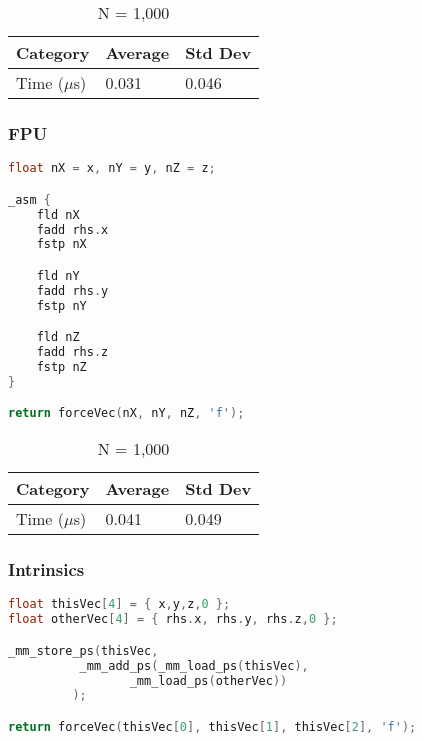 \documentclass{article}
\begin{document}
\vspace{3mm}

\begin{table}[ht!]
\centering
\begin{tabular}{l|l|l}
Category        &   Average &   Std Dev \\
\hline
Time ($\mu$s)    &   0.031   &   0.046   \\
\end{tabular}
\caption{N = 1,000}
\end{table}

\vspace{5mm}

\subsubsection{FPU}

\begin{lstlisting}[language=C++]
float nX = x, nY = y, nZ = z;

_asm {
	fld nX
	fadd rhs.x
	fstp nX

	fld nY
	fadd rhs.y
	fstp nY

	fld nZ
	fadd rhs.z
	fstp nZ
}

return forceVec(nX, nY, nZ, 'f');
\end{lstlisting}

\vspace{3mm}

\begin{table}[ht!]
\centering
\begin{tabular}{l|l|l}
Category        &   Average &   Std Dev \\
\hline
Time ($\mu$s)    &   0.041   &   0.049   \\
\end{tabular}
\caption{N = 1,000}
\end{table}

\vspace{5mm}

\subsubsection{Intrinsics}

\begin{lstlisting}[language=C++]
float thisVec[4] = { x,y,z,0 };
float otherVec[4] = { rhs.x, rhs.y, rhs.z,0 };

_mm_store_ps(thisVec, 
		  _mm_add_ps(_mm_load_ps(thisVec),
 		 		 _mm_load_ps(otherVec))
		 );

return forceVec(thisVec[0], thisVec[1], thisVec[2], 'f');
\end{lstlisting}
\end{document}
